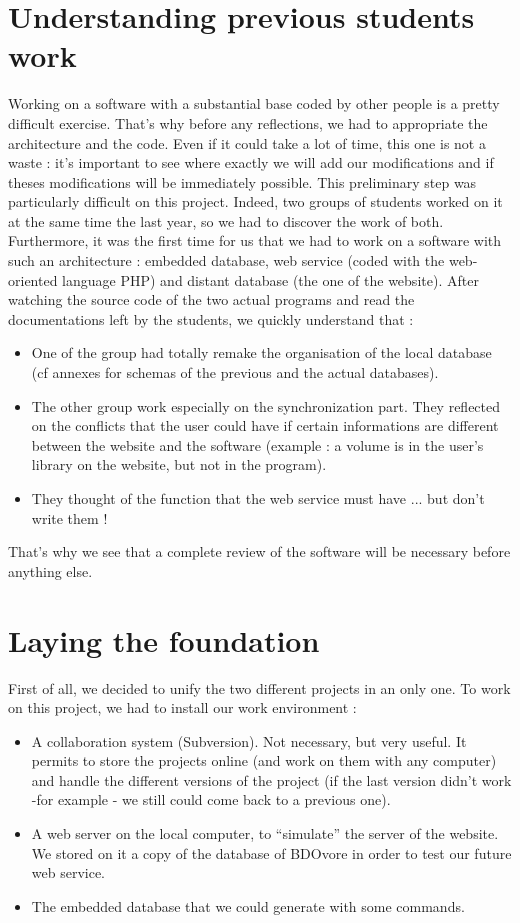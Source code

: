 \documentclass[11pt]{report} %
\begin{document}
\section{Understanding previous students work}
Working on a software with a substantial base coded by other people is a pretty difficult exercise. That's why before any reflections, we had to appropriate the architecture and the code. Even if it could take a lot of time, this one is not a waste : it's important to see where exactly we will add our modifications and if theses modifications will be immediately possible. \newline
This preliminary step was particularly difficult on this project. Indeed, two groups of students worked on it at the same time the last year, so we had to discover the work of both. Furthermore, it was the first time for us that we had to work on a software with such an architecture : embedded database, web service (coded with the web-oriented language PHP) and distant database (the one of the website).\newline
After watching the source code of the two actual programs and read the documentations left by the students, we quickly understand that :

\begin{itemize}
\item One of the group had totally remake the organisation of the local database (cf annexes for schemas of the previous and the actual databases).
\item The other group work especially on the synchronization part. They reflected on the conflicts that the user could have if certain informations are different between the website and the software (example : a volume is in the user's library on the website, but not in the program).
\item They thought of the function that the web service must have ... but don't write them !
\end{itemize}

That's why we see that a complete review of the software will be necessary before anything else.

\section{Laying the foundation}
First of all, we decided to unify the two different projects in an only one. To work on this project, we had to install our work environment :

\begin{itemize}
\item A collaboration system (Subversion). Not necessary, but very useful. It permits to store the projects online (and work on them with any computer) and handle the different versions of the project (if the last version didn't work -for example - we still could come back to a previous one).
\item A web server on the local computer, to ``simulate'' the server of the website. We stored on it a copy of the database of BDOvore in order to test our future web service.
\item The embedded database that we could generate with some commands.
\end{itemize}
\end{document}

